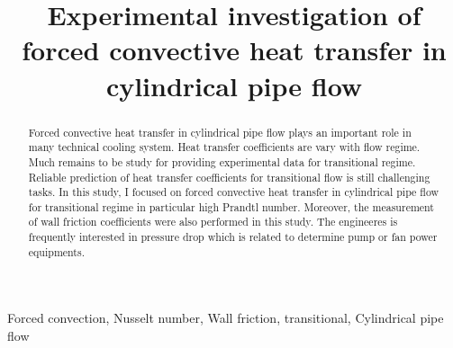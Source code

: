 \documentclass[conference]{IEEEtran}
\begin{document}
\title{Experimental investigation of forced convective heat transfer in cylindrical pipe flow\\
}

\author{
}

\maketitle

\begin{abstract}
Forced convective heat transfer in cylindrical pipe flow plays an important role in many technical cooling system.
Heat transfer coefficients are vary with flow regime.
Much remains to be study for providing experimental data for transitional regime.
Reliable prediction of heat transfer coefficients for transitional flow is still challenging tasks.
In this study, I focused on forced convective heat transfer in cylindrical pipe flow for transitional regime in particular high Prandtl number.
Moreover, the measurement of wall friction coefficients were also performed in this study.
The engineeres is frequently interested in pressure drop which is related to determine pump or fan power equipments.
\end{abstract}

\begin{IEEEkeywords}
Forced convection, Nusselt number, Wall friction, transitional, Cylindrical pipe flow
\end{IEEEkeywords}
\end{document}
